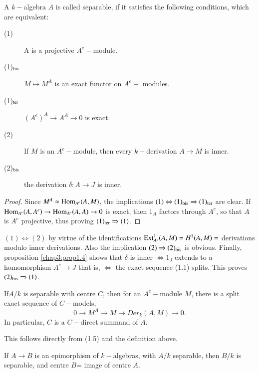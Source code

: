 \setcounter{propanddef}{5}
\begin{propanddef}%
A $k-$algebra $A$ is called separable, if it satisfies the following
conditions, which are equivalent: 
\begin{description}
\item[(1)] A is a projective $A^e-$module.

\item[(1)$_{\rm bis}$] $M \mapsto M^A$ is an exact functor on
  $A^e -$ modules. 

\item[(1)$_{\rm ter}$] $(A^e)^A \to A^A \to 0$ is exact. 

\item[(2)] If $M$ is an $A^e-$module, then every $k-$derivation $A \to
  M$ is inner.  

\item[(2)$_{\rm bis}$] the derivation $\delta : A \to J$ is
  inner. 
\end{description}
\end{propanddef}

\begin{proof}
Since $M^A \approx \operatorname{Hom}_{A^e}(A, M)$, the implications $(1)
\Leftrightarrow (1)_{\rm bis} \Rightarrow (1)_{\rm ter}$ are clear. If
$\operatorname{Hom}_{A^e} (A,A^e) \to \operatorname{Hom}_{A^e}(A, A) \to 0$ is exact, then $1_A$ factors
through $A^e$, so that $A$ is $A^e$ projective, thus proving
$(1)_{\rm ter} \Rightarrow (1)$. 
\end{proof}

$(1) \Leftrightarrow (2)$ by virtue of the identifications
$\operatorname{Ext}^1_{A^e}(A, M) = H^1(A, M) = $ derivations modulo inner
derivations. Also the implication $(2) \Rightarrow (2)_{\rm bis}$ is
obvious. Finally, proposition \ref{chap3:prop1.4} shows that $\delta$
is inner $\Leftrightarrow 1_J$ extends to a homomorphism $A^e
\rightarrow J$ that is, $\Leftrightarrow$ the exact sequence (1.1)
splits. This proves $(2)_{\rm bis} \Rightarrow (1)$.  

\setcounter{coro}{6}
\begin{coro}%
If\pageoriginale $A/k$ is separable with centre $C$, then for an
$A^e-$module $M$, there is a split exact sequence of $C-$models,  
$$
0 \to M^A \to M \to Der_k (A, M) \to 0.
$$
In particular, $C$ is a $C-$direct summand of $A$.
\end{coro}

This follows directly from (1.5) and the definition above. 

\begin{coro}%
If $A \to B$ is an epimorphism of $k-$algebras, with $A/k$ separable,
then $B/k$ is separable, and centre $B$= image of centre $A$. 
\end{coro}

